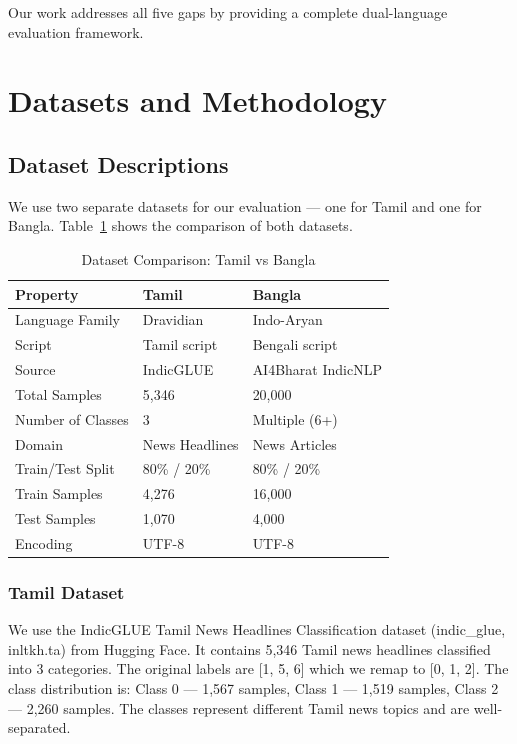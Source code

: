 \documentclass[conference]{IEEEtran}
\begin{document}
Our work addresses all five gaps by providing a complete dual-language evaluation framework.

\section{Datasets and Methodology}

\subsection{Dataset Descriptions}

We use two separate datasets for our evaluation --- one for Tamil and one for Bangla. Table~\ref{tab:datasets} shows the comparison of both datasets.

\begin{table}[h]
\centering
\caption{Dataset Comparison: Tamil vs Bangla}
\label{tab:datasets}
\begin{tabular}{lll}
\toprule
\textbf{Property} & \textbf{Tamil} & \textbf{Bangla} \\
\midrule
Language Family & Dravidian & Indo-Aryan \\
Script & Tamil script & Bengali script \\
Source & IndicGLUE & AI4Bharat IndicNLP \\
Total Samples & 5,346 & 20,000 \\
Number of Classes & 3 & Multiple (6+) \\
Domain & News Headlines & News Articles \\
Train/Test Split & 80\% / 20\% & 80\% / 20\% \\
Train Samples & 4,276 & 16,000 \\
Test Samples & 1,070 & 4,000 \\
Encoding & UTF-8 & UTF-8 \\
\bottomrule
\end{tabular}
\end{table}

\subsubsection{Tamil Dataset}
We use the IndicGLUE Tamil News Headlines Classification dataset (indic\_glue, inltkh.ta) from Hugging Face. It contains 5,346 Tamil news headlines classified into 3 categories. The original labels are [1, 5, 6] which we remap to [0, 1, 2]. The class distribution is: Class 0 --- 1,567 samples, Class 1 --- 1,519 samples, Class 2 --- 2,260 samples. The classes represent different Tamil news topics and are well-separated.
\end{document}

